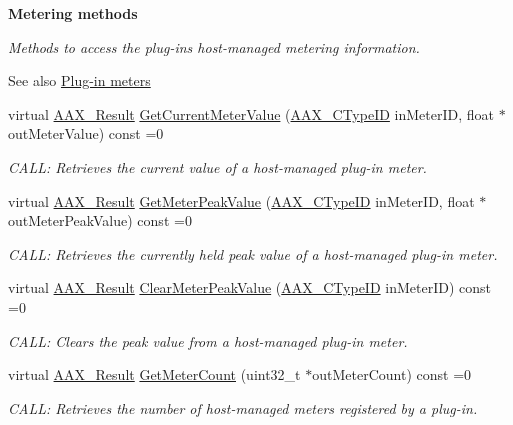 \begin{Indent}{\bf Metering methods}\par
{\em Methods to access the plug-\/in\textquotesingle{}s host-\/managed metering information.

\begin{DoxySeeAlso}{See also}
\hyperlink{a00337}{Plug-\/in meters} 
\end{DoxySeeAlso}
}\begin{DoxyCompactItemize}
\item 
virtual \hyperlink{a00149_a4d8f69a697df7f70c3a8e9b8ee130d2f}{A\+A\+X\+\_\+\+Result} \hyperlink{a00090_a13de9cc4bb7fb3848fbe12622c033135}{Get\+Current\+Meter\+Value} (\hyperlink{a00149_ac678f9c1fbcc26315d209f71a147a175}{A\+A\+X\+\_\+\+C\+Type\+I\+D} in\+Meter\+I\+D, float $\ast$out\+Meter\+Value) const =0
\begin{DoxyCompactList}\small\item\em C\+A\+L\+L\+: Retrieves the current value of a host-\/managed plug-\/in meter. \end{DoxyCompactList}\item 
virtual \hyperlink{a00149_a4d8f69a697df7f70c3a8e9b8ee130d2f}{A\+A\+X\+\_\+\+Result} \hyperlink{a00090_a85db3824256005c97689925750103765}{Get\+Meter\+Peak\+Value} (\hyperlink{a00149_ac678f9c1fbcc26315d209f71a147a175}{A\+A\+X\+\_\+\+C\+Type\+I\+D} in\+Meter\+I\+D, float $\ast$out\+Meter\+Peak\+Value) const =0
\begin{DoxyCompactList}\small\item\em C\+A\+L\+L\+: Retrieves the currently held peak value of a host-\/managed plug-\/in meter. \end{DoxyCompactList}\item 
virtual \hyperlink{a00149_a4d8f69a697df7f70c3a8e9b8ee130d2f}{A\+A\+X\+\_\+\+Result} \hyperlink{a00090_aa8fe057d2f53109e75662da0a492fa34}{Clear\+Meter\+Peak\+Value} (\hyperlink{a00149_ac678f9c1fbcc26315d209f71a147a175}{A\+A\+X\+\_\+\+C\+Type\+I\+D} in\+Meter\+I\+D) const =0
\begin{DoxyCompactList}\small\item\em C\+A\+L\+L\+: Clears the peak value from a host-\/managed plug-\/in meter. \end{DoxyCompactList}\item 
virtual \hyperlink{a00149_a4d8f69a697df7f70c3a8e9b8ee130d2f}{A\+A\+X\+\_\+\+Result} \hyperlink{a00090_a3ad8e35bb6b51be934696c39a45157e7}{Get\+Meter\+Count} (uint32\+\_\+t $\ast$out\+Meter\+Count) const =0
\begin{DoxyCompactList}\small\item\em C\+A\+L\+L\+: Retrieves the number of host-\/managed meters registered by a plug-\/in. \end{DoxyCompactList}\item 

\end{DoxyCompactItemize}
\end{Indent}
